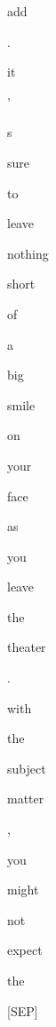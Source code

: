 \documentclass[varwidth=150mm]{standalone}
\begin{document}
\begin{CJK*}{UTF8}{gbsn}
{{{\colorbox{red!0.0}{\strut add} \colorbox{red!0.0}{\strut .} \colorbox{red!1.990249514579773}{\strut it} \colorbox{red!0.0}{\strut '} \colorbox{red!4.430553436279297}{\strut s} \colorbox{red!6.508358955383301}{\strut sure} \colorbox{red!3.7143235206604004}{\strut to} \colorbox{red!0.0}{\strut leave} \colorbox{red!1.861552357673645}{\strut nothing} \colorbox{red!0.0}{\strut short} \colorbox{red!0.0}{\strut of} \colorbox{red!0.0}{\strut a} \colorbox{red!0.0}{\strut big} \colorbox{red!0.0}{\strut smile} \colorbox{red!0.0}{\strut on} \colorbox{red!4.281394004821777}{\strut your} \colorbox{red!0.0}{\strut face} \colorbox{red!3.2312252521514893}{\strut as} \colorbox{red!6.43091344833374}{\strut you} \colorbox{red!3.4730639457702637}{\strut leave} \colorbox{red!14.265637397766113}{\strut the} \colorbox{red!34.48036193847656}{\strut theater} \colorbox{red!0.0}{\strut .} \colorbox{red!4.856382846832275}{\strut with} \colorbox{red!2.590714693069458}{\strut the} \colorbox{red!8.8399076461792}{\strut subject} \colorbox{red!1.2185733318328857}{\strut matter} \colorbox{red!0.0}{\strut ,} \colorbox{red!3.683886766433716}{\strut you} \colorbox{red!9.810176849365234}{\strut might} \colorbox{red!1.5928587913513184}{\strut not} \colorbox{red!1.5081124305725098}{\strut expect} \colorbox{red!59.61691665649414}{\strut the} \colorbox{red!4.82944917678833}{\strut [SEP]}
}}}
\end{CJK*}
\end{document}
